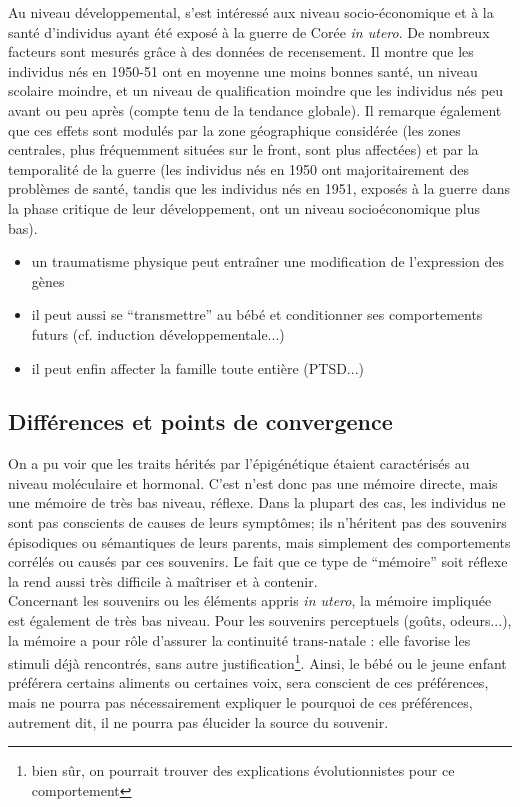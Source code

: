 \documentclass[french]{article}
\begin{document}
			Au niveau développemental, \cite{lee2014} s'est intéressé aux niveau socio-économique et à la santé d'individus ayant été exposé à la guerre de Corée \textit{in utero}. De nombreux facteurs sont mesurés grâce à des données de recensement. Il montre que les individus nés en 1950-51 ont en moyenne une moins bonnes santé, un niveau scolaire moindre, et un niveau de qualification moindre que les individus nés peu avant ou peu après (compte tenu de la tendance globale). Il remarque également que ces effets sont modulés par la zone géographique considérée (les zones centrales, plus fréquemment situées sur le front, sont plus affectées) et par la temporalité de la guerre (les individus nés en 1950 ont majoritairement des problèmes de santé, tandis que les individus nés en 1951, exposés à la guerre dans la phase critique de leur développement, ont un niveau socioéconomique plus bas).
			
			
		\begin{itemize}
			\item un traumatisme physique peut entraîner une modification de l'expression des gènes
			\item il peut aussi se ``transmettre'' au bébé et conditionner ses comportements futurs (cf. induction développementale...)
			\item il peut enfin affecter la famille toute entière (PTSD...)
		\end{itemize}
		\subsection{Différences et points de convergence}
			On a pu voir que les traits hérités par l'épigénétique étaient caractérisés au niveau moléculaire et hormonal. C'est n'est donc pas une mémoire directe, mais une mémoire de très bas niveau, réflexe. Dans la plupart des cas, les individus ne sont pas conscients de causes de leurs symptômes; ils n'héritent pas des souvenirs épisodiques ou sémantiques de leurs parents, mais simplement des comportements corrélés ou causés par ces souvenirs. Le fait que ce type de ``mémoire'' soit réflexe la rend aussi très difficile à maîtriser et à contenir. \\
			
			Concernant les souvenirs ou les éléments appris \textit{in utero}, la mémoire impliquée est également de très bas niveau. Pour les souvenirs perceptuels (goûts, odeurs...), la mémoire a pour rôle d'assurer la continuité trans-natale : elle favorise les stimuli déjà rencontrés, sans autre justification\footnote{bien sûr, on pourrait trouver des explications évolutionnistes pour ce comportement}. Ainsi, le bébé ou le jeune enfant préférera certains aliments ou certaines voix, sera conscient de ces préférences, mais ne pourra pas nécessairement expliquer le pourquoi de ces préférences, autrement dit, il ne pourra pas élucider la source du souvenir. \\
			
\end{document}
